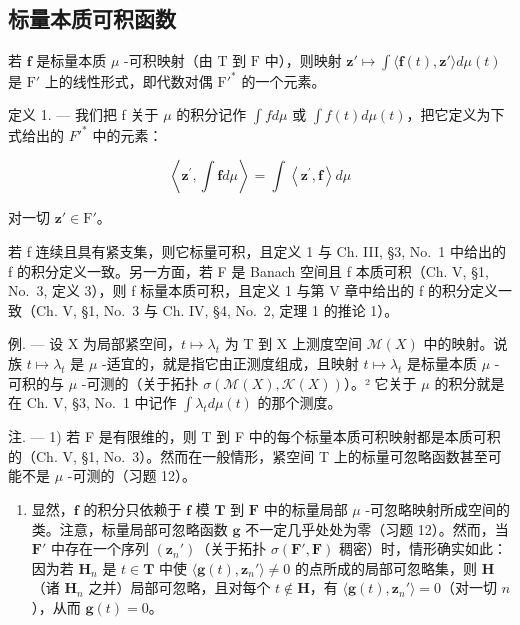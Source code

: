 \subsection{标量本质可积函数}

若 \(\mathbf{f}\) 是标量本质 \(\mu\) -可积映射（由 \(\mathrm{T}\) 到 \(\mathrm{F}\) 中），则映射 \(\mathbf{z}' \mapsto \int \langle \mathbf{f}(t), \mathbf{z}' \rangle d\mu(t)\) 是 \(\mathrm{F}'\) 上的线性形式，即代数对偶 \(\mathrm{F}'^*\) 的一个元素。

定义 1. --- 我们把 f 关于 \(\mu\) 的积分记作 \(\int f d\mu\) 或 \(\int f(t) d\mu(t)\)，把它定义为下式给出的 \(F'^{*}\) 中的元素：

\[
\left\langle \mathbf {z} ^ {\prime}, \int \mathbf {f} d \mu \right\rangle = \int \left\langle \mathbf {z} ^ {\prime}, \mathbf {f} \right\rangle d \mu
\]

对一切 \(\mathbf{z}' \in \mathrm{F}'\)。

若 f 连续且具有紧支集，则它标量可积，且定义 1 与 Ch. III, §3, No.~1 中给出的 f 的积分定义一致。另一方面，若 F 是 Banach 空间且 f 本质可积（Ch. V, §1, No.~3, 定义 3），则 f 标量本质可积，且定义 1 与第 V 章中给出的 f 的积分定义一致（Ch. V, §1, No.~3 与 Ch. IV, §4, No.~2, 定理 1 的推论 1）。

例. --- 设 X 为局部紧空间，\(t \mapsto \lambda_{t}\) 为 T 到 X 上测度空间 \(\mathcal{M}(X)\) 中的映射。说族 \(t \mapsto \lambda_{t}\) 是 \(\mu\) -适宜的，就是指它由正测度组成，且映射 \(t \mapsto \lambda_{t}\) 是标量本质 \(\mu\) -可积的与 \(\mu\) -可测的（关于拓扑 \(\sigma(\mathcal{M}(X), \mathcal{K}(X))\)）。² 它关于 \(\mu\) 的积分就是在 Ch. V, §3, No.~1 中记作 \(\int \lambda_t d\mu(t)\) 的那个测度。

注. --- 1) 若 F 是有限维的，则 T 到 F 中的每个标量本质可积映射都是本质可积的（Ch. V, §1, No.~3）。然而在一般情形，紧空间 T 上的标量可忽略函数甚至可能不是 \(\mu\) -可测的（习题 12）。

\begin{enumerate}
\def\labelenumi{\arabic{enumi})}
\setcounter{enumi}{1}
\tightlist
\item
  显然，\(\mathbf{f}\) 的积分只依赖于 \(\mathbf{f}\) 模 \(\mathbf{T}\) 到 \(\mathbf{F}\) 中的标量局部 \(\mu\) -可忽略映射所成空间的类。注意，标量局部可忽略函数 \(\mathbf{g}\) 不一定几乎处处为零（习题 12）。然而，当 \(\mathbf{F}'\) 中存在一个序列 \((\mathbf{z}_n')\)（关于拓扑 \(\sigma(\mathbf{F}',\mathbf{F})\) 稠密）时，情形确实如此：因为若 \(\mathbf{H}_n\) 是 \(t \in \mathbf{T}\) 中使 \(\langle \mathbf{g}(t), \mathbf{z}_n' \rangle \neq 0\) 的点所成的局部可忽略集，则 \(\mathbf{H}\)（诸 \(\mathbf{H}_n\) 之并）局部可忽略，且对每个 \(t \notin \mathbf{H}\)，有 \(\langle \mathbf{g}(t), \mathbf{z}_n' \rangle = 0\)（对一切 \(n\)），从而 \(\mathbf{g}(t) = 0\)。
\end{enumerate}

